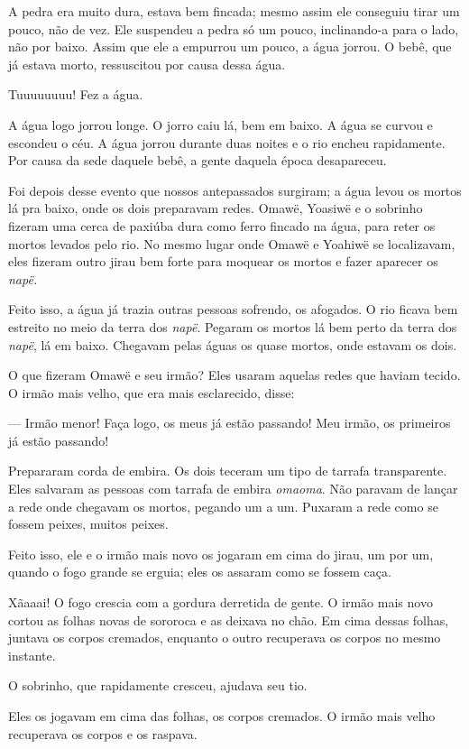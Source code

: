 A pedra era muito dura, estava bem fincada; mesmo assim ele conseguiu
tirar um pouco, não de vez. Ele suspendeu a pedra só um pouco,
inclinando-a para o lado, não por baixo. Assim que ele a empurrou um pouco, a
água jorrou. O bebê, que já estava morto, ressuscitou por causa dessa
água.

Tuuuuuuuu! Fez a água. 

A água logo jorrou longe. O jorro caiu lá, bem em baixo. A água se
curvou e escondeu o céu. A água jorrou durante duas noites e o rio
encheu rapidamente. Por causa da sede daquele bebê, a gente daquela
época desapareceu. 

Foi depois desse evento que nossos antepassados surgiram; a água levou
os mortos lá pra baixo, onde os dois preparavam redes. Omawë, Yoasiwë e o
sobrinho fizeram uma cerca de paxiúba dura como ferro fincado na água,
para reter os mortos levados pelo rio. No mesmo lugar onde Omawë e
Yoahiwë se localizavam, eles fizeram outro jirau bem forte para moquear
os mortos e fazer aparecer os \emph{napë.} 

Feito isso, a água já trazia outras pessoas sofrendo, os afogados. O rio ficava bem estreito no meio da terra dos \emph{napë}. Pegaram os
mortos lá bem perto da terra dos \emph{napë}, lá em baixo. Chegavam
pelas águas os quase mortos, onde estavam os dois. 

O que fizeram Omawë e seu irmão? Eles usaram aquelas redes que haviam
tecido. O irmão mais velho, que era mais esclarecido, disse: 

--- Irmão menor! Faça logo, os meus já estão passando! Meu irmão, os
primeiros já estão passando! 

Prepararam corda de embira. Os dois teceram um tipo de tarrafa transparente.
Eles salvaram as pessoas com tarrafa de embira \emph{omaoma}. Não paravam de
lançar a rede onde chegavam os mortos, pegando um a um. Puxaram a rede
como se fossem peixes, muitos peixes. 

Feito isso, ele e o irmão mais novo os jogaram em cima do jirau, um por
um, quando o fogo grande se erguia; eles os assaram como se fossem
caça. 

Xãaaai! O fogo crescia com a gordura derretida de gente. O irmão
mais novo cortou as folhas novas de sororoca e as deixava no chão. Em
cima dessas folhas, juntava os corpos cremados, enquanto o outro
recuperava os corpos no mesmo instante. 

O sobrinho, que rapidamente cresceu, ajudava seu tio. 

Eles os jogavam em cima das folhas, os corpos cremados. O irmão mais
velho recuperava os corpos e os raspava. 

